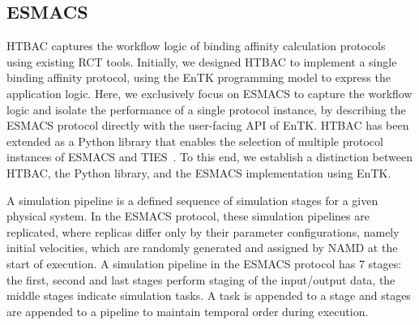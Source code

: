 \documentclass{bmcart}
\def\texttt{[image: ]}
\begin{document}

\subsection{ESMACS}\label{sec:htbac}

HTBAC captures the workflow logic of binding affinity calculation protocols using existing RCT tools. Initially, we designed HTBAC to implement a single binding affinity protocol, using the EnTK programming model to express the application logic. Here, we exclusively focus on ESMACS to capture the workflow logic and isolate the performance of a single protocol instance, by describing the ESMACS protocol directly with the user-facing API of EnTK. HTBAC has been extended as a Python library that enables the selection of multiple protocol instances of ESMACS and TIES~\cite{dakka}. To this end, we establish a distinction between HTBAC, the Python library, and the ESMACS implementation using EnTK. 


A simulation pipeline is a defined sequence of simulation stages for a given
physical system. In the ESMACS protocol, these simulation pipelines are
replicated, where replicas differ only by their parameter configurations,
namely initial velocities, which are randomly generated and assigned by NAMD
at the start of execution. A simulation pipeline in the ESMACS protocol has 7
stages: the first, second and last stages perform staging of the input/output
data, the middle stages indicate simulation tasks. A task is appended to a
stage and stages are appended to a pipeline to maintain temporal order during
execution. 


\end{document}
